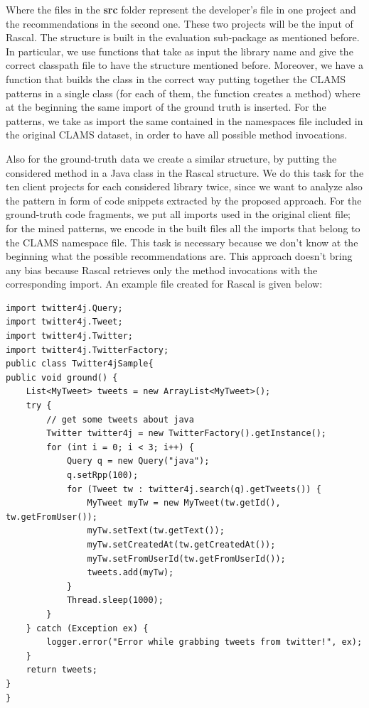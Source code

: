 Where the files in the \textbf{src} folder represent the developer's file in one project and the recommendations in the second one. These two projects will be the input of Rascal. The structure is built in the evaluation sub-package as mentioned before. In particular, we use functions that take as input the library name and give the correct classpath file to have the structure mentioned before. Moreover, we have a function that builds the class in the correct way putting together the CLAMS patterns in a single class (for each of them, the function creates a method) where at the beginning the same import of the ground truth is inserted. For the patterns, we take as import the same contained in the namespaces file included in the original CLAMS dataset, in order to have all possible method invocations.

Also for the ground-truth data we create a similar structure, by putting the considered method in a Java class in the Rascal structure. We do this task for the ten client projects for each considered library twice, since we want to analyze also the pattern in form of code snippets extracted by the proposed approach. For the ground-truth code fragments, we put all imports used in the original client file; for the mined patterns, we encode in the built files all the imports that belong to the CLAMS namespace file. This task is necessary because we don't know at the beginning what the possible recommendations are. This approach doesn't bring any bias because Rascal retrieves only the method invocations with the corresponding import. An example file created for Rascal is given below:

\begin{lstlisting}
import twitter4j.Query;
import twitter4j.Tweet;
import twitter4j.Twitter;
import twitter4j.TwitterFactory;
public class Twitter4jSample{
public void ground() {
    List<MyTweet> tweets = new ArrayList<MyTweet>();
    try {
        // get some tweets about java
        Twitter twitter4j = new TwitterFactory().getInstance();
        for (int i = 0; i < 3; i++) {
            Query q = new Query("java");
            q.setRpp(100);
            for (Tweet tw : twitter4j.search(q).getTweets()) {
                MyTweet myTw = new MyTweet(tw.getId(), tw.getFromUser());
                myTw.setText(tw.getText());
                myTw.setCreatedAt(tw.getCreatedAt());
                myTw.setFromUserId(tw.getFromUserId());
                tweets.add(myTw);
            }
            Thread.sleep(1000);
        }
    } catch (Exception ex) {
        logger.error("Error while grabbing tweets from twitter!", ex);
    }
    return tweets;
}
}
\end{lstlisting}

